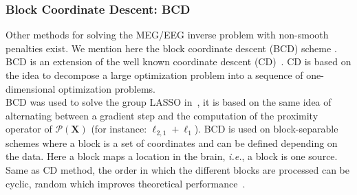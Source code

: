 

\subsubsection*{Block Coordinate Descent: BCD}
Other methods for solving the MEG/EEG inverse problem with non-smooth penalties exist. We mention here the block coordinate descent (BCD) scheme \cite{tseng2010approximation}. BCD is an extension of the well known coordinate descent (CD)~\cite{li-osher:2009,nesterov2012efficiency}. CD is based on the idea to decompose a large optimization problem into a sequence of one-dimensional optimization problems. \\

BCD was used to solve the group LASSO in~\cite{rakotomamonjy2011surveying,qin2013efficient}, it is based on the same idea of alternating between a gradient step and the computation of the proximity operator of $\mathcal{P}(\mathbf{X})$ (for instance: $\ell_{2,1}+\ell_1$). BCD is used on block-separable schemes where a block is a set of coordinates and can be defined depending on the data. Here a block maps a location in the brain, \textit{i.e.}, a block is one source. Same as CD method, the order in which the different blocks are processed can be cyclic, random which improves theoretical performance~\cite{tseng2001convergence,wei2012doa}. \\

